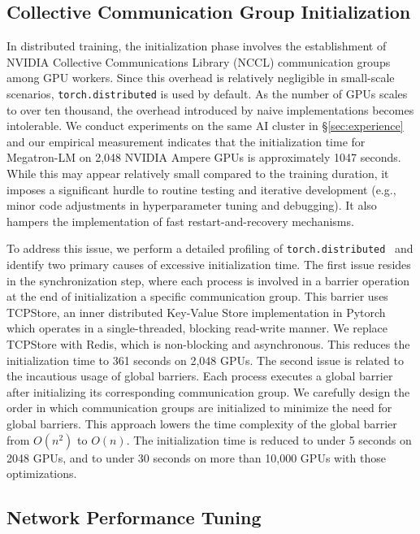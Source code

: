 \documentclass[letterpaper,twocolumn,10pt]{article}
\newcommand{\revision}[1]{{#1}}
\begin{document}
\subsection{Collective Communication Group Initialization}

In distributed training, the initialization phase involves the establishment of
NVIDIA Collective Communications Library (NCCL) communication groups among GPU
workers. Since this overhead is relatively negligible in small-scale scenarios,
\texttt{torch.distributed} is used by default. As the number of GPUs scales to
over ten thousand, the overhead introduced by naive implementations becomes
intolerable. \revision{We conduct experiments on the same AI cluster in \S\ref{sec:experience} and our empirical measurement indicates that the initialization time for Megatron-LM on 2,048 NVIDIA Ampere GPUs is approximately 1047 seconds.} While this may
appear relatively small compared to the training duration, it imposes a
significant hurdle to routine testing and iterative development (e.g., minor
code adjustments in hyperparameter tuning and debugging). It also hampers
the implementation of fast restart-and-recovery mechanisms.

\revision{To address this issue, we perform a detailed profiling of
\texttt{torch.distributed}~\cite{li2020pytorch}} and identify two primary causes of excessive
initialization time. The first issue resides in the synchronization step, where
each process is involved in a barrier operation at the end of initialization a
specific communication group. \revision{This barrier uses TCPStore, an inner distributed Key-Value Store implementation in Pytorch which
operates in a single-threaded, blocking read-write manner.} We replace TCPStore
with Redis, which is non-blocking and asynchronous. This reduces the
initialization time to 361 seconds on 2,048 GPUs. The second issue is related to
the incautious usage of global barriers. Each process executes a global barrier
after initializing its corresponding communication group. We carefully design
the order in which communication groups are initialized to minimize the need for
global barriers. This approach lowers the time complexity of the global barrier from $O(n^2)$ to $O(n)$. The initialization time is reduced to under 5 seconds on 2048 GPUs, and to under 30 seconds on more than 10,000 GPUs with those optimizations.

\subsection{Network Performance Tuning}
\end{document}
